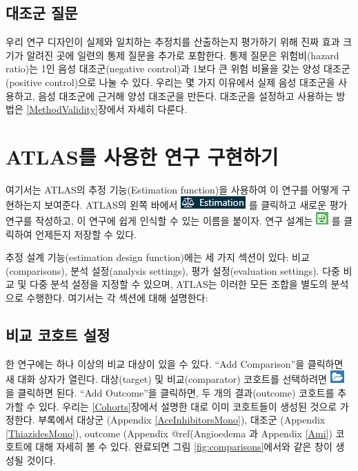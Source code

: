 \documentclass[11pt]{book}
\theoremstyle{definition}
\theoremstyle{definition}
\theoremstyle{definition}
\theoremstyle{remark}
\begin{document}
\subsection{대조군 질문}\label{-}

우리 연구 디자인이 실제와 일치하는 추정치를 산출하는지 평가하기 위해
진짜 효과 크기가 알려진 곳에 일련의 통제 질문을 추가로 포함한다. 통제
질문은 위험비(hazard ratio)는 1인 음성 대조군(negative control)과 1보다
큰 위험 비율을 갖는 양성 대조군(positive control)으로 나눌 수 있다.
우리는 몇 가지 이유에서 실제 음성 대조군을 사용하고, 음성 대조군에
근거해 양성 대조군을 만든다. 대조군을 설정하고 사용하는 방법은
\ref{MethodValidity}장에서 자세히 다룬다.

\section{ATLAS를 사용한 연구 구현하기}\label{PleAtlas}

여기서는 ATLAS의 추정 기능(Estimation function)을 사용하여 이 연구를
어떻게 구현하는지 보여준다. ATLAS의 왼쪽 바에서
\includegraphics{images/PopulationLevelEstimation/estimation.png} 를
클릭하고 새로운 평가 연구를 작성하고, 이 연구에 쉽게 인식할 수 있는
이름을 붙이자. 연구 설계는
\includegraphics{images/PopulationLevelEstimation/save.png} 를 클릭하여
언제든지 저장할 수 있다.

추정 설계 기능(estimation design function)에는 세 가지 섹션이 있다:
비교(comparisons), 분석 설정(analysis settings), 평가 설정(evaluation
settings). 다중 비교 및 다중 분석 설정을 지정할 수 있으며, ATLAS는
이러한 모든 조합을 별도의 분석으로 수행한다. 여기서는 각 섹션에 대해
설명한다:

\subsection{비교 코호트 설정}\label{ComparisonSettings}

한 연구에는 하나 이상의 비교 대상이 있을 수 있다. ``Add Comparison''을
클릭하면 새 대화 상자가 열린다. 대상(target) 및 비교(comparator)
코호트를 선택하려면
\includegraphics{images/PopulationLevelEstimation/open.png} 을 클릭하면
된다. ``Add Outcome''을 클릭하면, 두 개의 결과(outcome) 코호트를 추가할
수 있다. 우리는 \ref{Cohorts}장에서 설명한 대로 이미 코호트들이 생성된
것으로 가정한다. 부록에서 대상군 (Appendix \ref{AceInhibitorsMono}),
대조군 (Appendix \ref{ThiazidesMono}), outcome (Appendix @ref(Angioedema
과 Appendix \ref{Ami}) 코호트에 대해 자세히 볼 수 있다. 완료되면 그림
\ref{fig:comparisons}에서와 같은 창이 생성될 것이다.
\end{document}
